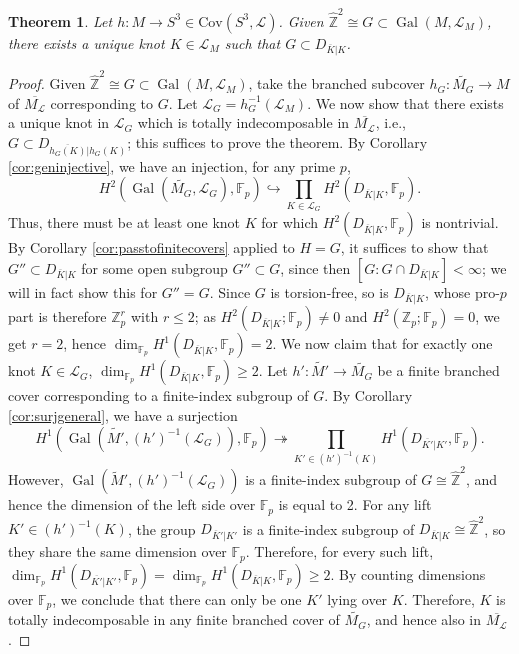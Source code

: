 \documentclass{amsart}
\theoremstyle{plain}
\newtheorem{theorem}{Theorem}[section]
\theoremstyle{definition}
\theoremstyle{plain}
\theoremstyle{plain}
\theoremstyle{plain}
\theoremstyle{remark}
\theoremstyle{remark}
\theoremstyle{plain}
\theoremstyle{definition}
\theoremstyle{plain}
\DeclareMathOperator{\Gal}{\mathrm{Gal}}
\theoremstyle{plain}
\theoremstyle{plain}
\numberwithin{equation}{section}
\begin{document}
\begin{theorem}\label{thm:localcorrespondence}
Let $h: M \to S^3 \in \mathrm{Cov}(S^3, \mathcal{L})$. Given $\widehat{\mathbb{Z}}^2 \cong G \subset \Gal(M, \mathcal{L}_M)$, there exists a unique knot $K \in \mathcal{L}_M$ such that $G \subset D_{\overline{K}|K}$.
\end{theorem}

\begin{proof}
Given $\widehat{\mathbb{Z}}^2 \cong G \subset \Gal(M, \mathcal{L}_M)$, take the branched subcover $h_G: \widetilde{M_G} \to M$ of $\overline{M_\mathcal{L}}$ corresponding to $G$. Let $\mathcal{L}_G = h_G^{-1}(\mathcal{L}_M)$. We now show that there exists a unique knot in $\mathcal{L}_G$ which is totally indecomposable in $\overline{M_\mathcal{L}}$, i.e., $G \subset D_{\overline{h_G(K)}|h_G(K)}$; this suffices to prove the theorem. By Corollary \ref{cor:geninjective}, we have an injection, for any prime $p$,
\begin{equation}
     H^2(\Gal(\widetilde{M_G}, \mathcal{L}_G), \mathbb{F}_p) \hookrightarrow \prod_{K \in \mathcal{L}_G} H^2(D_{\overline{K}|K}, \mathbb{F}_p).
\end{equation}
Thus, there must be at least one knot $K$ for which $H^2(D_{\overline{K}|K}, \mathbb{F}_p)$ is nontrivial. By Corollary \ref{cor:passtofinitecovers} applied to $H = G$, it suffices to show that $G'' \subset D_{\overline K|K}$ for some open subgroup $G'' \subset G$, since then $[G:G \cap D_{\overline K|K}] < \infty$; we will in fact show this for $G'' = G$. Since $G$ is torsion-free, so is $D_{\overline K|K}$, whose pro-$p$ part is therefore $\mathbb Z_p^r$ with $r \leq 2$; as $H^2(D_{\overline K|K}; \mathbb F_p) \neq 0$ and $H^2(\mathbb Z_p; \mathbb F_p) = 0$, we get $r = 2$, hence $\dim_{\mathbb F_p}H^1(D_{\overline K|K}, \mathbb F_p) = 2$. We now claim that for exactly one knot $K \in \mathcal{L}_G$, $\dim_{\mathbb{F}_p}H^1(D_{\overline{K}|K}, \mathbb{F}_p) \geq 2$. Let $h': \widetilde{M'} \to \widetilde{M_G}$ be a finite branched cover corresponding to a finite-index subgroup of $G$. By Corollary \ref{cor:surjgeneral}, we have a surjection
\begin{equation}
    H^1(\Gal(\widetilde{M'}, (h')^{-1}(\mathcal{L}_G)), \mathbb{F}_p) \twoheadrightarrow \prod_{K' \in (h')^{-1}(K)}H^1(D_{\overline{K'}|K'}, \mathbb{F}_p).
\end{equation}
However, $\Gal(\widetilde{M}', (h')^{-1}(\mathcal{L}_G))$ is a finite-index subgroup of $G \cong \widehat{\mathbb{Z}}^2$, and hence the dimension of the left side over $\mathbb{F}_p$ is equal to 2. For any lift $K' \in (h')^{-1}(K)$, the group $D_{\overline K'|K'}$ is a finite-index subgroup of $D_{\overline K|K} \cong \widehat{\mathbb Z}^2$, so they share the same dimension over $\mathbb F_p$. Therefore, for every such lift, $\dim_{\mathbb{F}_p}H^1(D_{\overline{K'}|K'}, \mathbb{F}_p) = \dim_{\mathbb{F}_p}H^1(D_{\overline{K}|K}, \mathbb{F}_p) \geq 2$. By counting dimensions over $\mathbb{F}_p$, we conclude that there can only be one $K'$ lying over $K$. Therefore, $K$ is totally indecomposable in any finite branched cover of $\widetilde{M_G}$, and hence also in $\overline{M_\mathcal{L}}$.

\end{proof}
\end{document}
